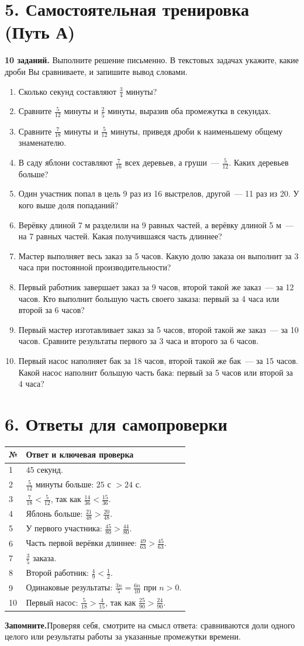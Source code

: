 \documentclass[a4paper,12pt]{article}
\newcommand{\sectionline}[1]{\section*{\color{darkaccent}#1}}
\newcommand{\keyidea}[1]{\par\noindent\textcolor{darkaccent}{\textbf{Запомните.}}\enspace #1\par}
\begin{document}
\clearpage
\sectionline{5. Самостоятельная тренировка \textnormal{(Путь А)}}
\textbf{10 заданий.} Выполните решение письменно. В текстовых задачах укажите, какие дроби Вы сравниваете, и запишите вывод словами.

\begin{enumerate}[itemsep=1.05em]
\item Сколько секунд составляют $\frac34$ минуты?
\item Сравните $\frac5{12}$ минуты и $\frac25$ минуты, выразив оба промежутка в секундах.
\item Сравните $\frac7{18}$ минуты и $\frac5{12}$ минуты, приведя дроби к наименьшему общему знаменателю.
\item В саду яблони составляют $\frac7{16}$ всех деревьев, а груши~--- $\frac5{12}$. Каких деревьев больше?
\item Один участник попал в цель 9 раз из 16 выстрелов, другой~--- 11 раз из 20. У кого выше доля попаданий?
\item Верёвку длиной 7 м разделили на 9 равных частей, а верёвку длиной 5 м~--- на 7 равных частей. Какая получившаяся часть длиннее?
\item Мастер выполняет весь заказ за 5 часов. Какую долю заказа он выполнит за 3 часа при постоянной производительности?
\item Первый работник завершает заказ за 9 часов, второй такой же заказ~--- за 12 часов. Кто выполнит большую часть своего заказа: первый за 4 часа или второй за 6 часов?
\item Первый мастер изготавливает заказ за 5 часов, второй такой же заказ~--- за 10 часов. Сравните результаты первого за 3 часа и второго за 6 часов.
\item Первый насос наполняет бак за 18 часов, второй такой же бак~--- за 15 часов. Какой насос наполнит большую часть бака: первый за 5 часов или второй за 4 часа?
\end{enumerate}

\clearpage
\sectionline{6. Ответы для самопроверки}
\begin{tabularx}{\linewidth}{@{}p{13mm}X@{}}
\toprule
\textbf{№}&\textbf{Ответ и ключевая проверка}\\
\midrule
1&$45$ секунд.\\
2&$\frac5{12}$ минуты больше: $25$ с $>24$ с.\\
3&$\frac7{18}<\frac5{12}$, так как $\frac{14}{36}<\frac{15}{36}$.\\
4&Яблонь больше: $\frac{21}{48}>\frac{20}{48}$.\\
5&У первого участника: $\frac{45}{80}>\frac{44}{80}$.\\
6&Часть первой верёвки длиннее: $\frac{49}{63}>\frac{45}{63}$.\\
7&$\frac35$ заказа.\\
8&Второй работник: $\frac49<\frac12$.\\
9&Одинаковые результаты: $\frac{3n}{5}=\frac{6n}{10}$ при $n>0$.\\
10&Первый насос: $\frac5{18}>\frac4{15}$, так как $\frac{25}{90}>\frac{24}{90}$.\\
\bottomrule
\end{tabularx}

\vspace{9mm}
\keyidea{Проверяя себя, смотрите на смысл ответа: сравниваются доли одного целого или результаты работы за указанные промежутки времени.}
\end{document}
